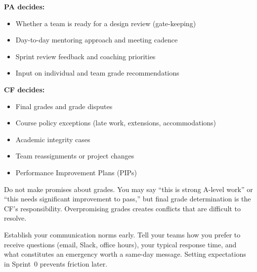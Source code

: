 \begin{faqbox}
\textbf{PA decides:}
\begin{itemize}[nosep,leftmargin=1.5em]
\item Whether a team is ready for a design review (gate-keeping)
\item Day-to-day mentoring approach and meeting cadence
\item Sprint review feedback and coaching priorities
\item Input on individual and team grade recommendations
\end{itemize}

\textbf{CF decides:}
\begin{itemize}[nosep,leftmargin=1.5em]
\item Final grades and grade disputes
\item Course policy exceptions (late work, extensions, accommodations)
\item Academic integrity cases
\item Team reassignments or project changes
\item Performance Improvement Plans (PIPs)
\end{itemize}
\end{faqbox}

\begin{warnbox}
Do not make promises about grades. You may say ``this is strong A-level work'' or ``this needs significant improvement to pass,'' but final grade determination is the CF's responsibility. Overpromising grades creates conflicts that are difficult to resolve.
\end{warnbox}

\begin{bestpractice}
Establish your communication norms early. Tell your teams how you prefer to receive questions (email, Slack, office hours), your typical response time, and what constitutes an emergency worth a same-day message. Setting expectations in Sprint~0 prevents friction later.
\end{bestpractice}


